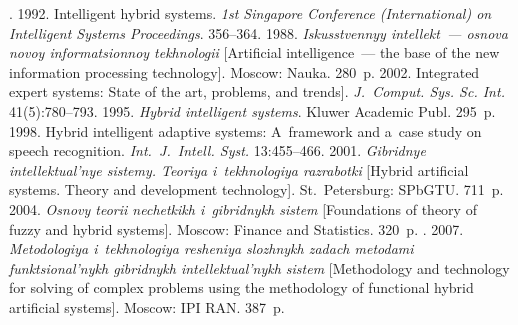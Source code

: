 





  \begin{multicols}{2}

\renewcommand{\bibname}{\protect\rmfamily References}

{\small\frenchspacing
 {%
 \begin{thebibliography}{99}
. 1992. Intelligent hybrid systems. \textit{1st Singapore 
Conference (International) on Intelligent Systems Proceedings}. 356--364.
 1988. \textit{Iskusstvennyy intellekt~--- osnova novoy informatsionnoy 
tekhnologii} [Artificial intelligence~--- the base of the new information processing technology]. 
Moscow: Nauka. 280~p.
 2002. Integrated expert systems: State of the art, problems,
and trends]. 
\textit{J.~Comput. Sys. Sc. Int.} 41(5):780--793.
 1995. \textit{Hybrid intelligent systems}. Kluwer Academic Publ.  295~p.
 1998. Hybrid intelligent adaptive systems: A~framework and 
a~case study on speech recognition. \textit{Int.\ J.~Intell. Syst.} 13:455--466.
 2001. \textit{Gibridnye intellektual'nye sistemy. Teoriya i~tekhnologiya 
razrabotki} [Hybrid artificial systems. Theory and development technology]. St.\ Petersburg: 
\mbox{SPbGTU}. 711~p.
 2004. \textit{Osnovy teorii nechetkikh i~gibridnykh sistem} [Foundations 
of theory of fuzzy and hybrid systems]. Moscow: Finance and Statistics. 320~p.
. 2007. \textit{Metodologiya i~tekhnologiya resheniya 
slozhnykh zadach metodami funk\-tsi\-onal'\-nykh gibridnykh intellektual'nykh sistem} [Methodology 
and technology for solving of complex problems using the methodology of functional hybrid 
artificial systems]. Moscow: IPI RAN. 387~p.


\end{thebibliography}}}
\end{multicols}
